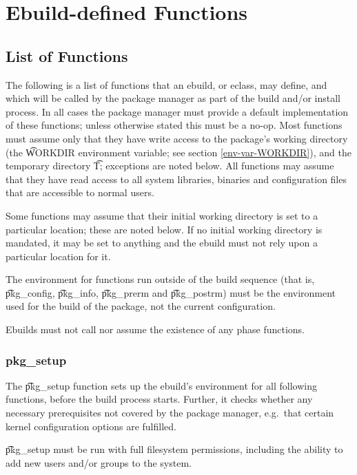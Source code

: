 \chapter{Ebuild-defined Functions}
\label{ebuild-functions}

\section{List of Functions}
\label{functions}

The following is a list of functions that an ebuild, or eclass, may define, and which will be called
by the package manager as part of the build and/or install process. In all cases the package manager
must provide a default implementation of these functions; unless otherwise stated this must be a
no-op. Most functions must assume only that they have write access to the package's working
directory (the \t{WORKDIR} environment variable; see section \ref{env-var-WORKDIR}), and the
temporary directory \t{T}; exceptions are noted below. All functions may assume that they have read
access to all system libraries, binaries and configuration files that are accessible to normal
users.

Some functions may assume that their initial working directory is set to a particular location;
these are noted below. If no initial working directory is mandated, it may be set to anything and
the ebuild must not rely upon a particular location for it.

The environment for functions run outside of the build sequence (that is, \t{pkg\_config},
\t{pkg\_info}, \t{pkg\_prerm} and \t{pkg\_postrm}) must be the environment used for the build of the
package, not the current configuration.

Ebuilds must not call nor assume the existence of any phase functions.

\subsection{pkg\_setup}
\label{pkg-setup-function}
The \t{pkg\_setup} function sets up the ebuild's environment for all following functions, before
the build process starts. Further, it checks whether any necessary prerequisites not covered
by the package manager, e.g.\ that certain kernel configuration options are fulfilled.

\t{pkg\_setup} must be run with full filesystem permissions, including the ability to add new users
and/or groups to the system.

